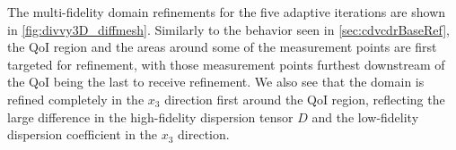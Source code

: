 \documentclass[review]{siamart0516}
\begin{document}
The multi-fidelity domain refinements for the five adaptive iterations are shown in \cref{fig:divvy3D_diffmesh}. Similarly to the behavior seen in \cref{sec:cdvcdrBaseRef}, the QoI region and the areas around some of the measurement points are first targeted for refinement, with those measurement points furthest downstream of the QoI being the last to receive refinement. We also see that the domain is refined completely in the $x_3$ direction first around the QoI region, reflecting the large difference in the high-fidelity dispersion tensor $D$ and the low-fidelity dispersion coefficient in the $x_3$ direction.
%
\begin{figure}[htbp]
\centering
{}
 \\
\end{figure}
\end{document}
